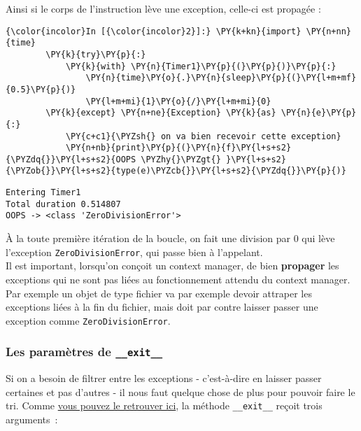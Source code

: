     Ainsi si le corps de l'instruction lève une exception, celle-ci est
propagée :

    \begin{Verbatim}[commandchars=\\\{\}]
{\color{incolor}In [{\color{incolor}2}]:} \PY{k+kn}{import} \PY{n+nn}{time}
        \PY{k}{try}\PY{p}{:}
            \PY{k}{with} \PY{n}{Timer1}\PY{p}{(}\PY{p}{)}\PY{p}{:}
                \PY{n}{time}\PY{o}{.}\PY{n}{sleep}\PY{p}{(}\PY{l+m+mf}{0.5}\PY{p}{)}
                \PY{l+m+mi}{1}\PY{o}{/}\PY{l+m+mi}{0}
        \PY{k}{except} \PY{n+ne}{Exception} \PY{k}{as} \PY{n}{e}\PY{p}{:}
            \PY{c+c1}{\PYZsh{} on va bien recevoir cette exception}
            \PY{n+nb}{print}\PY{p}{(}\PY{n}{f}\PY{l+s+s2}{\PYZdq{}}\PY{l+s+s2}{OOPS \PYZhy{}\PYZgt{} }\PY{l+s+s2}{\PYZob{}}\PY{l+s+s2}{type(e)\PYZcb{}}\PY{l+s+s2}{\PYZdq{}}\PY{p}{)}
\end{Verbatim}


    \begin{Verbatim}[commandchars=\\\{\}]
Entering Timer1
Total duration 0.514807
OOPS -> <class 'ZeroDivisionError'>

    \end{Verbatim}

    À la toute première itération de la boucle, on fait une division par 0
qui lève l'exception \texttt{ZeroDivisionError}, qui passe bien à
l'appelant.\\

Il est important, lorsqu'on conçoit un context manager, de bien
\textbf{propager} les exceptions qui ne sont pas liées au fonctionnement
attendu du context manager. Par exemple un objet de type fichier va par
exemple devoir attraper les exceptions liées à la fin du fichier, mais
doit par contre laisser passer une exception comme
\texttt{ZeroDivisionError}.

    \hypertarget{les-paramuxe8tres-de-__exit__}{%
\subsubsection{\texorpdfstring{Les paramètres de
\texttt{\_\_exit\_\_}}{Les paramètres de \_\_exit\_\_}}\label{les-paramuxe8tres-de-__exit__}}

    Si on a besoin de filtrer entre les exceptions - c'est-à-dire en laisser
passer certaines et pas d'autres - il nous faut quelque chose de plus
pour pouvoir faire le tri. Comme
\href{https://docs.python.org/3/reference/datamodel.html\#with-statement-context-managers}{vous
pouvez le retrouver ici}, la méthode \texttt{\_\_exit\_\_} reçoit trois
arguments~:

